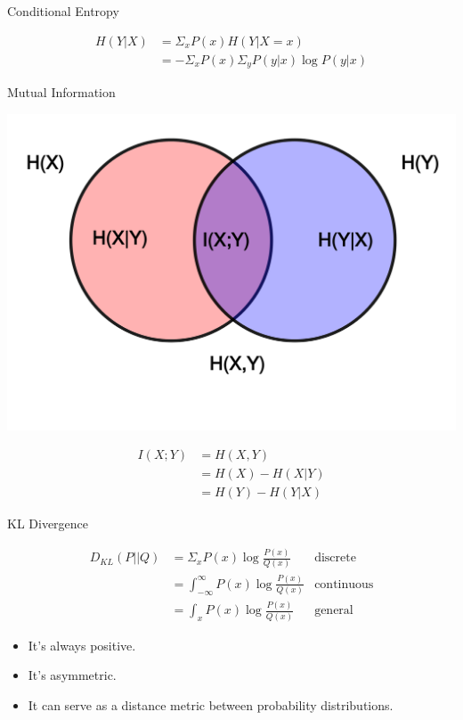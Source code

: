 \documentclass{beamer}
\begin{document}
\begin{frame}{Conditional Entropy}{}
  
    \begin{align*}
        H(Y|X) 
        &= \Sigma_x P(x) H(Y|X=x) \\
        &= - \Sigma_x P(x) \Sigma_y P(y|x) \log P(y|x)
    \end{align*}

\end{frame}

\begin{frame}{Mutual Information}{}

  \begin{center}
    \includegraphics[height=0.5\textheight]{conditional_entropy}
  \end{center}
  
  \begin{align*}
        I(X;Y) &= H(X,Y)  \\
        &= H(X) - H(X|Y)  \\
        &= H(Y) - H(Y|X)
    \end{align*}

\end{frame}

\begin{frame}{KL Divergence}{}

  \begin{align*}
      D_{KL}(P||Q)
      &= \Sigma_x P(x) \log \frac{P(x)}{Q(x)} & \text{discrete} \\
      &= \int_{-\infty}^{\infty} P(x) \log \frac{P(x)}{Q(x)} & \text{continuous} \\
      &= \int_x P(x) \log \frac{P(x)}{Q(x)} & \text{general}
  \end{align*}
  
  \begin{itemize}
      \item It's always positive.
      \item It's asymmetric.
      \item It can serve as a distance metric between probability distributions.
  \end{itemize}

\end{frame}
\end{document}
